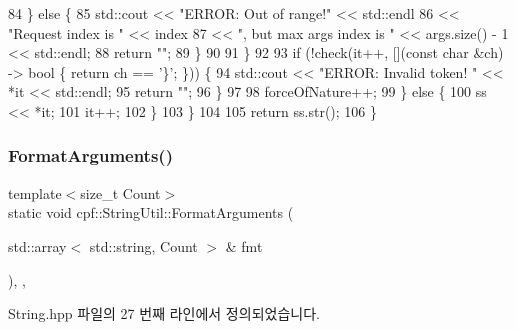 \begin{DoxyCode}
84                         \} \textcolor{keywordflow}{else} \{
85                             std::cout << \textcolor{stringliteral}{"ERROR: Out of range!"} << std::endl 
86                                 << \textcolor{stringliteral}{"Request index is "} << index 
87                                 << \textcolor{stringliteral}{", but max args index is "} << args.size() - 1 << std::endl;
88                             \textcolor{keywordflow}{return} \textcolor{stringliteral}{""};
89                         \}
90     
91                     \}
92 
93                     \textcolor{keywordflow}{if} (!check(it++, [](\textcolor{keyword}{const} \textcolor{keywordtype}{char} &ch) -> \textcolor{keywordtype}{bool} \{ \textcolor{keywordflow}{return} ch == \textcolor{charliteral}{'\}'}; \})) \{
94                         std::cout << \textcolor{stringliteral}{"ERROR: Invalid token! "} << *it << std::endl;
95                         \textcolor{keywordflow}{return} \textcolor{stringliteral}{""};
96                     \}
97 
98                     forceOfNature++;
99                 \} \textcolor{keywordflow}{else} \{
100                     ss << *it;
101                     it++;
102                 \}
103             \}
104 
105             \textcolor{keywordflow}{return} ss.str();
106         \}
\end{DoxyCode}
\mbox{\label{classcpf_1_1_string_util_af6a0483e9f189a49f9f25a6ca74d94a2}} 
\subsubsection{\texorpdfstring{Format\+Arguments()}{FormatArguments()}\hspace{0.1cm}{\footnotesize\ttfamily [1/2]}}
{\footnotesize\ttfamily template$<$size\+\_\+t Count$>$ \\
static void cpf\+::\+String\+Util\+::\+Format\+Arguments (\begin{DoxyParamCaption}\item[{std\+::array$<$ std\+::string, Count $>$ \&}]{fmt }\end{DoxyParamCaption})\hspace{0.3cm}{\ttfamily [inline]}, {\ttfamily [static]}, {\ttfamily [private]}}



String.\+hpp 파일의 27 번째 라인에서 정의되었습니다.


